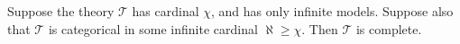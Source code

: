 Suppose the theory $\mathcal{T}$ has cardinal $\chi$, and has only infinite models. Suppose also that $\mathcal{T}$ is categorical in some infinite cardinal $\aleph \geqslant \chi$. Then $\mathcal{T}$ is complete.
